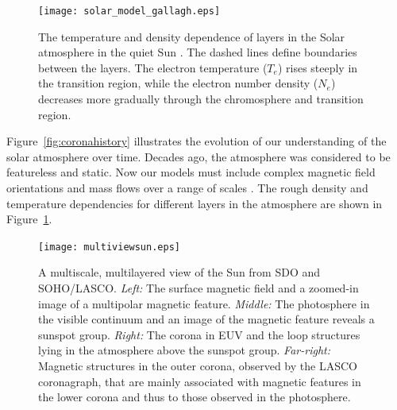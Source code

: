\begin{figure}[!t]
\centerline{\texttt{[image: solar\_model\_gallagh.eps]}}
\caption[The temperature and density dependence of the Solar atmosphere.]{The temperature and density dependence of layers in the Solar atmosphere in the quiet Sun \citep[from][]{Gallagher:2000}. The dashed lines define boundaries between the layers. The electron temperature ($T_e$) rises steeply in the transition region, while the electron number density ($N_e$) decreases more gradually through the chromosphere and transition region.}
\label{fig:atmostdens}
\end{figure}


Figure~\ref{fig:coronahistory} illustrates the evolution of our understanding of the solar atmosphere over time. Decades ago, the atmosphere was considered to be featureless and static. Now our models must include complex magnetic field orientations and mass flows over a range of scales \citep{Schrijver:2001b}. The rough density and temperature dependencies for different layers in the atmosphere are shown in Figure~\ref{fig:atmostdens}.

\begin{landscape}
\begin{figure}%
\centerline{\texttt{[image: multiviewsun.eps]}}
\caption[A view of the Sun from SDO and SOHO/LASCO.]{A multiscale, multilayered view of the Sun from SDO and SOHO/LASCO. \emph{Left:} The surface magnetic field and a zoomed-in image of a multipolar magnetic feature. \emph{Middle:} The photosphere in the visible continuum and an image of the magnetic feature reveals a sunspot group. \emph{Right:} The corona in EUV and the loop structures lying in the atmosphere above the sunspot group. \emph{Far-right:} Magnetic structures in the outer corona, observed by the LASCO coronagraph, that are mainly associated with magnetic features in the lower corona and thus to those observed in the photosphere.}
\label{fig:multiviewsun}
\end{figure}
\end{landscape}


